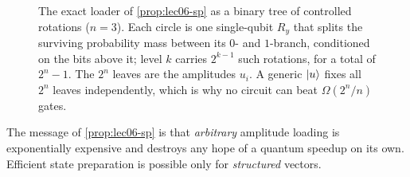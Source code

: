 \begin{figure}[ht]
\centering
{}
\caption{The exact loader of \cref{prop:lec06-sp} as a binary tree of controlled
rotations ($n=3$). Each circle is one single-qubit $R_y$ that splits the surviving
probability mass between its $0$- and $1$-branch, conditioned on the bits above it;
level $k$ carries $2^{k-1}$ such rotations, for a total of $2^n-1$. The $2^n$ leaves
are the amplitudes $u_i$. A generic $\ket u$ fixes all $2^n$ leaves independently,
which is why no circuit can beat $\Omega(2^n/n)$ gates.}
\label{fig:lec06-sptree}
\end{figure}

The message of \cref{prop:lec06-sp} is that \emph{arbitrary} amplitude loading is
exponentially expensive and destroys any hope of a quantum speedup on its own.
Efficient state preparation is possible only for \emph{structured} vectors.

